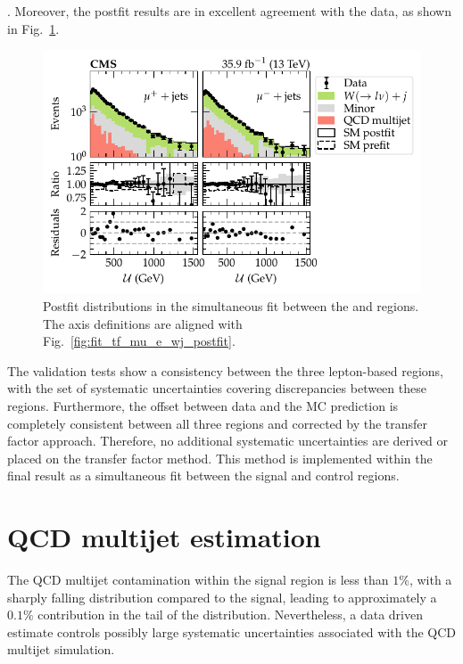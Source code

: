 \cite{Lindert:2017olm}. Moreover, the postfit results are in excellent
agreement with the data, as shown in Fig.~\ref{fig:fit_tf_mup_mun_wj_postfit}.
%
\begin{figure}[htb]
    \centering
    \includegraphics{chapters/042_backgrounds/images/postfit_tfmup2munwj.pdf}
    \caption[Recoil distributions after a fit to the positive and negative muon control regions]{
        Postfit \recoil distributions in the simultaneous fit between the \mupplusjets and \munplusjets regions. The axis definitions are aligned with Fig.~\ref{fig:fit_tf_mu_e_wj_postfit}.
    }
    \label{fig:fit_tf_mup_mun_wj_postfit}
\end{figure}

The validation tests show a consistency between the three lepton-based
regions, with the set of systematic uncertainties covering discrepancies
between these regions. Furthermore, the offset between data and the MC
prediction is completely consistent between all three regions and corrected by
the transfer factor approach. Therefore, no additional systematic
uncertainties are derived or placed on the \IWj transfer factor method. This
method is implemented within the final result as a simultaneous fit between
the signal and control regions.


\section{QCD multijet estimation}

The QCD multijet contamination within the \metplusjets signal region is less
than $1\%$, with a sharply falling \recoil distribution compared to the
signal, leading to approximately a $0.1\%$ contribution in the tail of the
\recoil distribution. Nevertheless, a data driven estimate controls possibly
large systematic uncertainties associated with the QCD multijet simulation.

